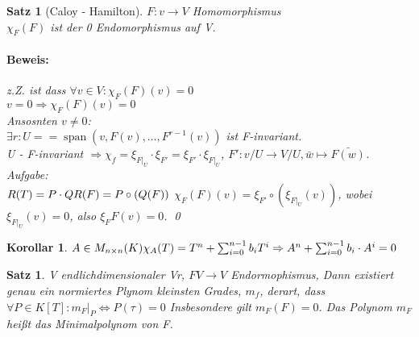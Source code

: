 \documentclass{report}
\DeclareMathOperator{\Span}{span}
\theoremstyle{customrem}
\theoremstyle{customdef}
\newtheorem{korrolar}[definition]{Korollar}
\newtheorem{satz}[definition]{Satz}
\renewenvironment{proof}{\paragraph{Beweis: }}{\qed}
\theoremstyle{customenv}
\begin{document}
\begin{satz}[Caloy - Hamilton]
  \(F : v \to V\) Homomorphismus\\
  \(\chi_F(F)\) ist der 0 Endomorphismus auf V.
  \begin{proof}
    z.Z. ist dass \(\forall v \in V : \chi_F(F)(v) = 0\)\\
    \(v = 0 \Rightarrow \chi_F(F)(v) = 0\)\\
    Ansosnten \(v \neq 0\):\\
    \(\exists r : U =  = \Span(v, F(v), \dots, F^{r-1}(v))\) ist F-invariant.\\
    U - F-invariant \(\Rightarrow \chi_f = \xi_{F|_U} \cdot \xi_{F'} = \xi_{F'} \cdot \xi_{F|_U}\), \(F' : v/U \to V/U, \bar{w} \mapsto \bar{F(w)}\).\\
    Aufgabe:\\
    \(R(T) = P \cdot Q\\ %
    R(F) = P \circ (Q(F))\) %
    \(\chi_F(F)(v) = \xi_{F'} \circ (\xi_{F|_U}(v))\), wobei \(\xi_{F|_U}(v) = 0\), also \(\xi_F{F}(v) = 0\).
  \end{proof}
\end{satz}

\begin{korrolar}
  \(A \in M_{n \times n}(K)\\
  \chi_A(T) = T^n + \sum_{i=0}^{n-1}b_i T^i \Rightarrow A^n + \sum_{i=0}^{n-1} b_i \cdot A^i = 0\)
\end{korrolar}

\begin{satz}
  V endlichdimensionaler Vr, \(F V \to V\) Endormophismus, Dann existiert genau ein normiertes
  Plynom kleinsten Grades,  \(m_f\), derart, dass \(\forall P \in K[T] : m_F |_P \Leftrightarrow P(\tau) = 0\)
  Insbesondere gilt \(m_F(F) = 0\). Das  Polynom \(m_F\) hei\ss{}t das Minimalpolynom von F. 
\end{satz}

\end{document}
